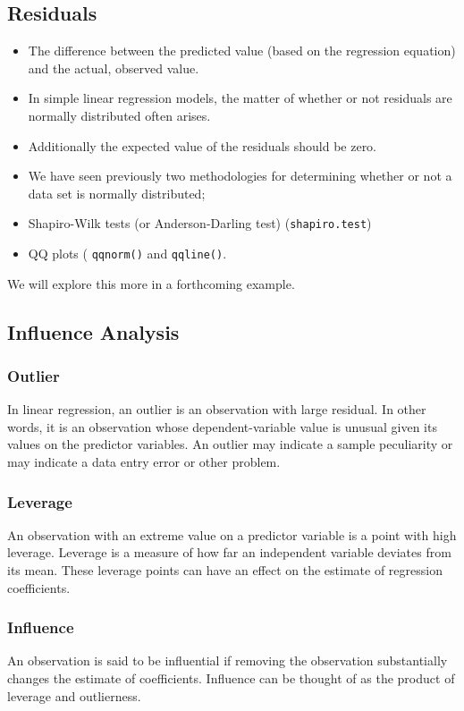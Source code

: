 \documentclass[a4paper,12pt]{article}
\begin{document}
\subsection{Residuals}  
\begin{itemize}
\item The difference between the predicted value (based on the regression equation) and the actual, observed value. 
\item In simple linear regression models, the matter of whether or not residuals are normally distributed often arises.
\item Additionally the expected value of the residuals should be zero.
\item We have seen previously two methodologies for determining whether or not a data set is normally distributed;
\end{itemize}

\begin{itemize} \item 	Shapiro-Wilk tests (or Anderson-Darling test) (\texttt{shapiro.test})
\item 	QQ plots ( \texttt{qqnorm()} and \texttt{qqline()}.
\end{itemize}

We will explore this more in a forthcoming example.
\newpage
\subsection{Influence Analysis}


\subsubsection{Outlier} In linear regression, an outlier is an observation with large residual.  In other words, it is an observation whose dependent-variable value is unusual given its values on the predictor variables.  An outlier may indicate a sample peculiarity or may indicate a data entry error or other problem.
\subsubsection{Leverage}  An observation with an extreme value on a predictor variable is a point with high leverage.  Leverage is a measure of how far an independent variable deviates from its mean.  These leverage points can have an effect on the estimate of regression coefficients.

\subsubsection{Influence} An observation is said to be influential if removing the observation substantially changes the estimate of coefficients.  Influence can be thought of as the product of leverage and outlierness.
\end{document}
